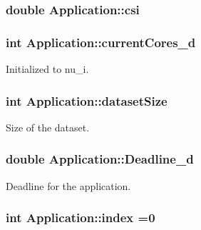 \hypertarget{classApplication_a20adc533c6b6147342b3f60dc0fbd9bc}{
\subsubsection[{csi}]{\setlength{\rightskip}{0pt plus 5cm}double Application\-::csi}}\label{classApplication_a20adc533c6b6147342b3f60dc0fbd9bc}
\hypertarget{classApplication_adee341a84a5389dfd4d16e7f8e697190}{
\subsubsection[{current\-Cores\-\_\-d}]{\setlength{\rightskip}{0pt plus 5cm}int Application\-::current\-Cores\-\_\-d}}\label{classApplication_adee341a84a5389dfd4d16e7f8e697190}


Initialized to nu\-\_\-i. 

\hypertarget{classApplication_aaa155e818d807f585d83ecacf4abfe42}{
\subsubsection[{dataset\-Size}]{\setlength{\rightskip}{0pt plus 5cm}int Application\-::dataset\-Size}}\label{classApplication_aaa155e818d807f585d83ecacf4abfe42}


Size of the dataset. 

\hypertarget{classApplication_a2a989ae288a74ee5250b5acf449c864a}{
\subsubsection[{Deadline\-\_\-d}]{\setlength{\rightskip}{0pt plus 5cm}double Application\-::\-Deadline\-\_\-d}}\label{classApplication_a2a989ae288a74ee5250b5acf449c864a}


Deadline for the application. 

\hypertarget{classApplication_ac3f0d1900b7ca640c270666d166db530}{
\subsubsection[{index}]{\setlength{\rightskip}{0pt plus 5cm}int Application\-::index =0}}\label{classApplication_ac3f0d1900b7ca640c270666d166db530}


